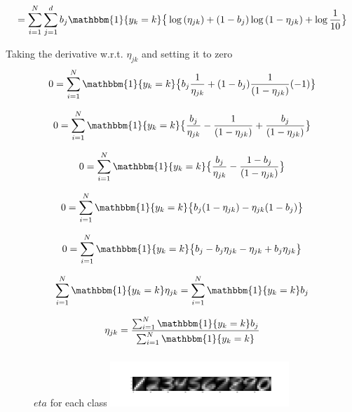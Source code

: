 \documentclass[12pt,letterpaper]{article} %
\newcommand{\switch}[0]{\mathbbm{1}\{y_k=k\}}
\begin{document}
 \begin{equation*}
 =\sum^N_{i=1}\sum^d_{j=1}{b_j}\switch\big\{\log{(\eta_{jk})}+ (1-{b_j})\log{(1-\eta_{jk})} + \log{\frac{1}{10}}\big\}
 \end{equation*}

Taking the derivative w.r.t. $\eta_{jk}$ and setting it to zero
\begin{equation*}
0 = \sum^N_{i=1}\switch\big\{b_j\frac{1}{\eta_{jk}} + (1-{b_j})\frac{1}{(1-\eta_{jk})}(-1)\big\}
\end{equation*}

\begin{equation*}
0 = \sum^N_{i=1}\switch\big\{\frac{b_j}{\eta_{jk}} -\frac{1}{(1-\eta_{jk})} +  \frac{b_j}{(1-\eta_{jk})}\big\}
\end{equation*}

\begin{equation*}
0 = \sum^N_{i=1}\switch\big\{\frac{b_j}{\eta_{jk}} -\frac{1- b_j}{(1-\eta_{jk})}\big\}
\end{equation*}

\begin{equation*}
0 = \sum^N_{i=1}\switch\big\{{b_j}(1-\eta_{jk}) - \eta_{jk}(1-b_j)\big\}
\end{equation*}

\begin{equation*}
0 = \sum^N_{i=1}\switch\big\{b_j-b_j\eta_{jk} - \eta_{jk} + b_j\eta_{jk}\big\}
\end{equation*}

\begin{equation*}
\sum^N_{i=1}\switch\eta_{jk} = \sum^N_{i=1}\switch{}b_j
\end{equation*}


\begin{equation*}
\eta_{jk} = \frac{\sum^N_{i=1}\switch{}b_j}{\sum^N_{i=1}\switch}
\end{equation*}

\subsubsection{}
 \begin{figure}[!h]
  \centering
  \caption{}{  $eta$ for each class}
   \includegraphics[width=0.6\textwidth, trim={3in 0in 0in 0in},clip=true ]{q2_3_eta.png}
\end{figure}
\FloatBarrier
\end{document}
